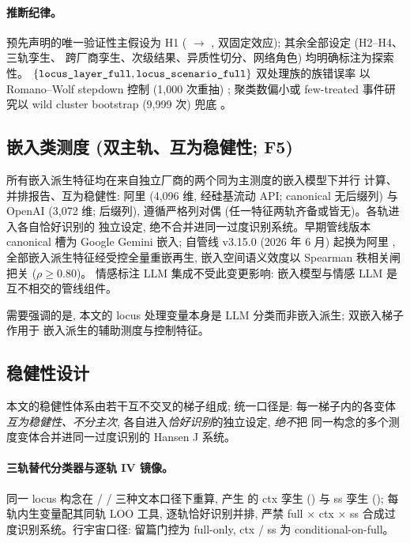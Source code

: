 \paragraph{推断纪律。}
预先声明的唯一验证性主假设为 H1 ( $\to$
, 双固定效应); 其余全部设定 (H2--H4、三轨孪生、
跨厂商孪生、次级结果、异质性切分、网络角色) 均明确标注为探索性。
$\{\texttt{locus\_layer\_full}, \texttt{locus\_scenario\_full}\}$ 双处理族的族错误率
以 Romano--Wolf stepdown 控制 (1{,}000 次重抽) \parencite{romanowolf2005stepdown};
聚类数偏小或 few-treated 事件研究以 wild cluster bootstrap (9{,}999 次) 兜底
\parencite{roodman2019boottest}。

\subsection{嵌入类测度 (双主轨、互为稳健性; F5)}

所有嵌入派生特征均在来自独立厂商的两个同为主测度的嵌入模型下并行
计算、并排报告、互为稳健性: 阿里 
(4{,}096 维, 经硅基流动 API; canonical 无后缀列) 与 OpenAI
 (3{,}072 维;  后缀列),
遵循严格列对偶 (任一特征两轨齐备或皆无)。各轨进入各自恰好识别的
独立设定, 绝不合并进同一过度识别系统。早期管线版本 canonical 槽为
Google Gemini 嵌入; 自管线 v3.15.0 (2026 年 6 月) 起换为阿里
, 全部嵌入派生特征经受控全量重嵌再生,
嵌入空间语义效度以 Spearman 秩相关闸把关 ($\rho \geq 0.80$)。
情感标注 LLM 集成不受此变更影响: 嵌入模型与情感 LLM
是互不相交的管线组件。

需要强调的是, 本文的 locus 处理变量本身是 LLM 分类而非嵌入派生; 双嵌入梯子作用于
嵌入派生的辅助测度与控制特征。

\subsection{稳健性设计}\label{subsec:robust}

本文的稳健性体系由若干互不交叉的梯子组成; 统一口径是: 每一梯子内的各变体
\emph{互为稳健性、不分主次}, 各自进入\emph{恰好识别}的独立设定, \emph{绝不}把
同一构念的多个测度变体合并进同一过度识别的 Hansen J 系统。

\paragraph{三轨替代分类器与逐轨 IV 镜像。}
同一 locus 构念在  /  /  三种文本口径下重算, 产生
 的 ctx 孪生 () 与 ss 孪生
(); 每轨内生变量配其同轨 LOO 工具, 逐轨恰好识别并排, 严禁
full $\times$ ctx $\times$ ss 合成过度识别系统。行宇宙口径: 留篇门控为 full-only,
ctx / ss 为 conditional-on-full。

